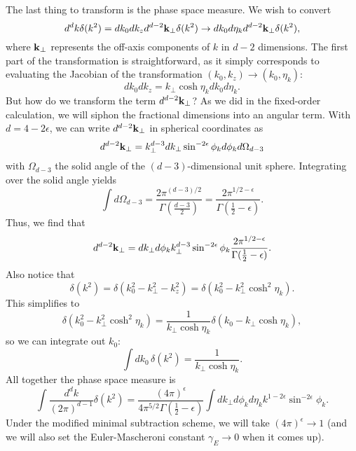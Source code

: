 \documentclass[12pt,twoside,class=../reedthesis, crop=false]{standalone}
\begin{document}
	The last thing to transform is the phase space measure. We wish to convert
	\begin{equation}
		d^d k \delta(k^2) = dk_0 dk_z d^{d - 2}\vb{k}_\perp \delta(k^2) \to dk_0 d\eta_{k} d^{d - 2}\vb{k}_\perp \delta(k^2),
	\end{equation}
	where $\vb{k}_\perp$ represents the off-axis components of $k$ in $d - 2$ dimensions. The first part of the transformation is straightforward, as it simply corresponds to evaluating the Jacobian of the transformation $(k_0, k_z) \to (k_0, \eta_k)$:
	\begin{equation}
		dk_0 dk_z = k_\perp \cosh\eta_k dk_0 d\eta_k.
	\end{equation}
	But how do we transform the term $d^{d - 2}\vb{k}_\perp$? As we did in the fixed-order calculation, we will siphon the fractional dimensions into an angular term. With $d = 4 - 2\epsilon$, we can write $d^{d -2}\vb{k}_\perp$ in spherical coordinates as
	\begin{equation}
		d^{d - 2} \vb{k}_\perp = k_\perp^{d - 3} dk_\perp \sin^{-2\epsilon}\phi_k d\phi_k d\Omega_{d - 3}
	\end{equation}
	with $\Omega_{d - 3}$ the solid angle of the $(d - 3)$-dimensional unit sphere. Integrating over the solid angle yields \cite{schwartz_quantum_2014}
	\begin{equation}
		\int d\Omega_{d - 3} = \frac{2\pi^{(d - 3)/2}}{\Gamma(\frac{d - 3}{2})} = \frac{2\pi^{1/2 - \epsilon}}{\Gamma(\frac{1}{2} - \epsilon)}.
	\end{equation}
	Thus, we find that
	\begin{equation}
		d^{d - 2}\vb{k}_\perp = dk_\perp d\phi_k k_\perp^{d - 3} \sin^{-2\epsilon}\phi_k \frac{2\pi^{1/2 - \epsilon}}{\Gamma(\frac{1}{2} - \epsilon)}.
	\end{equation}
	Also notice that
	\begin{equation}
		\delta(k^2) = \delta(k_0^2 - k_\perp^2 - k_z^2) = \delta(k_0^2 - k_\perp^2 \cosh^2\eta_k).
	\end{equation}
	This simplifies to
	\begin{equation}
		\delta(k_0^2 - k_\perp^2 \cosh^2\eta_k) = \frac{1}{k_\perp \cosh\eta_k}\delta(k_0 - k_\perp \cosh\eta_k),
	\end{equation}
	so we can integrate out $k_0$:
	\begin{equation}
		\int dk_0 \, \delta(k^2) = \frac{1}{k_\perp \cosh\eta_k}.
	\end{equation}
	All together the phase space measure is
	\begin{equation}\label{eq:phase space measure specific coords}
		\int \frac{d^d k}{(2 \pi)^{d - 1}} \delta(k^2) = \frac{(4\pi)^{\epsilon}}{4 \pi^{5/2} \Gamma(\frac{1}{2} - \epsilon)} \int dk_\perp d\phi_k d\eta_k k^{1 - 2\epsilon} \sin^{-2\epsilon} \phi_k.
	\end{equation}
	Under the modified minimal subtraction scheme, we will take $(4\pi)^\epsilon \to 1$ (and we will also set the Euler-Mascheroni constant $\gamma_E \to 0$ when it comes up).
\end{document}
